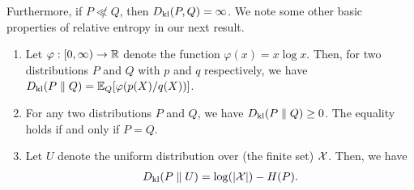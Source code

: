         Furthermore, if $P \not \ll Q$, then $D_{\text{kl}}(P,Q) = \infty$. We note some other basic properties of relative entropy in our next result. 

        \begin{proposition}
            \label{prop:rel-ent-basic-properties}
            \begin{enumerate}[label=(\alph*)]
                \item Let $\varphi:[0, \infty) \to \mathbb{R}$ denote the function $\varphi(x) = x \log x$. Then, for two distributions $P$ and $Q$ with \pmf $p$ and $q$ respectively,  we have $D_{\text{kl}}(P\parallel Q) = \mathbb{E}_Q[\varphi(p(X)/q(X))]$. 
                \item For any two distributions $P$ and $Q$, we have $D_{\text{kl}}(P \parallel Q) \geq 0$. The equality holds if and only if $P=Q$. 
                \item Let $U$ denote the uniform distribution over  (the finite set) $\mathcal{X}$. Then, we have 
                \begin{align}
                    D_{\text{kl}}(P\parallel U) = \log(|\mathcal{X}|) - H(P). 
                \end{align}
            \end{enumerate}
        \end{proposition}

